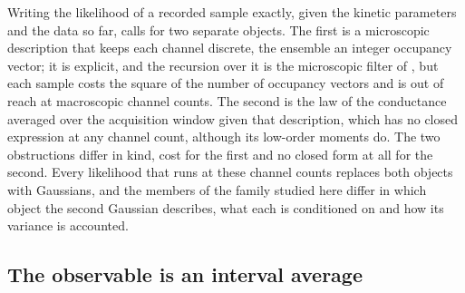 
Writing the likelihood of a recorded sample exactly, given the kinetic parameters and the
data so far, calls for two separate objects. The first is a microscopic description that
keeps each channel discrete, the ensemble an integer occupancy vector; it is explicit, and
the recursion over it is the microscopic filter of \citet{moffatt2007estimation}, but each
sample costs the square of the number of occupancy vectors and is out of reach at
macroscopic channel counts. The second is the law of the conductance averaged over the
acquisition window given that description, which has no closed expression at any channel
count, although its low-order moments do. The two obstructions differ in kind, cost for the
first and no closed form at all for the second. Every likelihood that runs at these channel
counts replaces both objects with Gaussians, and the members of the family studied here differ in which
object the second Gaussian describes, what each is conditioned on and how its variance is
accounted.

\subsection*{The observable is an interval average}

